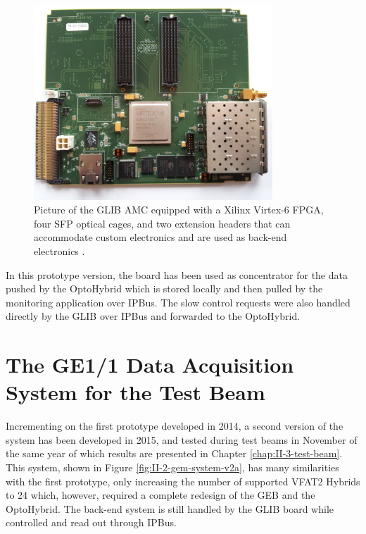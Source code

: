       \begin{figure}[h!]
        \centering
        \includegraphics[width=0.8\textwidth]{img/II-2-daq/glib.jpg}
        \caption{Picture of the GLIB AMC equipped with a Xilinx Virtex-6 FPGA, four SFP optical cages, and two extension headers that can accommodate custom electronics and are used as back-end electronics \cite{Vichoudis:1359270}.}
        \label{fig:II-2-glib}
      \end{figure}

       In this prototype version, the board has been used as concentrator for the data pushed by the OptoHybrid which is stored locally and then pulled by the monitoring application over IPBus. The slow control requests were also handled directly by the GLIB over IPBus and forwarded to the OptoHybrid.

  \section{The GE1/1 Data Acquisition System for the Test Beam}

    Incrementing on the first prototype developed in 2014, a second version of the system has been developed in 2015, and tested during test beams in November of the same year of which results are presented in Chapter \ref{chap:II-3-test-beam}. This system, shown in Figure \ref{fig:II-2-gem-system-v2a}, has many similarities with the first prototype, only increasing the number of supported VFAT2 Hybrids to 24 which, however, required a complete redesign of the GEB and the OptoHybrid. The back-end system is still handled by the GLIB board while controlled and read out through IPBus.

